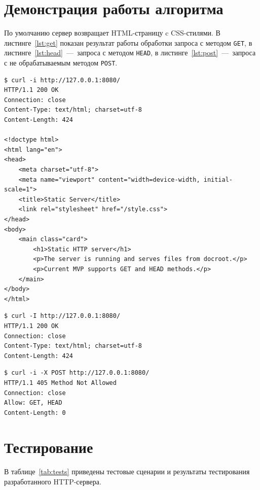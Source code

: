 \section{Демонстрация работы алгоритма}

По умолчанию сервер возвращает HTML-страницу c CSS-стилями. В листинге~\ref{lst:get} показан результат работы обработки запроса с методом \texttt{GET}, в листинге~\ref{lst:head}~---~запроса с методом \texttt{HEAD}, в листинге~\ref{lst:post}~---~запроса с не обрабатываемым методом \texttt{POST}.

\begin{lstlisting}[caption={Запрос GET}, label={lst:get}]
$ curl -i http://127.0.0.1:8080/
HTTP/1.1 200 OK
Connection: close
Content-Type: text/html; charset=utf-8
Content-Length: 424

<!doctype html>
<html lang="en">
<head>
	<meta charset="utf-8">
	<meta name="viewport" content="width=device-width, initial-scale=1">
	<title>Static Server</title>
	<link rel="stylesheet" href="/style.css">
</head>
<body>
	<main class="card">
		<h1>Static HTTP server</h1>
		<p>The server is running and serves files from docroot.</p>
		<p>Current MVP supports GET and HEAD methods.</p>
	</main>
</body>
</html>
\end{lstlisting}

\begin{lstlisting}[caption={Запрос HEAD}, label={lst:head}]
$ curl -I http://127.0.0.1:8080/
HTTP/1.1 200 OK
Connection: close
Content-Type: text/html; charset=utf-8
Content-Length: 424
\end{lstlisting}

\begin{lstlisting}[caption={Запрос HEAD}, label={lst:post}]
$ curl -i -X POST http://127.0.0.1:8080/
HTTP/1.1 405 Method Not Allowed
Connection: close
Allow: GET, HEAD
Content-Length: 0
\end{lstlisting}

\section{Тестирование}

В таблице~\ref{tab:tests} приведены тестовые сценарии и результаты тестирования разработанного HTTP-сервера.

